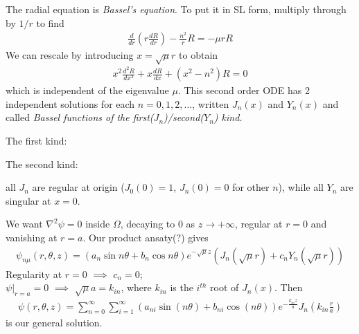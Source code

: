 \documentclass[a4paper]{article}
\begin{document}
The radial equation is \emph{Bassel's equation}. To put it in SL form, multiply through by $1/r$ to find
\begin{equation*}
\begin{aligned}
\frac{d}{dr} \left(r\frac{dR}{dr}\right) - \frac{n^2}{r} R = -\mu r R
\end{aligned}
\end{equation*}
We can rescale by introducing $x = \sqrt{\mu} r$ to obtain
\begin{equation*}
\begin{aligned}
x^2 \frac{d^2R}{dx^2} + x\frac{dR}{dx} + \left(x^2 - n^2\right) R = 0
\end{aligned}
\end{equation*}
which is independent of the eigenvalue $\mu$. This second order ODE has 2 independent solutions for each $n=0,1,2,...$, written $J_n\left(x\right)$ and $Y_n\left(x\right)$ and called \emph{Bassel functions of the first($J_n$)/second($Y_n$) kind.}

The first kind:


The second kind:


all $J_n$ are regular at origin ($J_0\left(0\right) = 1$, $J_n\left(0\right) = 0$ for other $n$), while all $Y_n$ are singular at $x=0$.

We want $\nabla^2 \psi = 0$ inside $\Omega$, decaying to $0$ as $z \to +\infty$, regular at $r=0$ and vanishing at $r=a$. Our product ansaty(?) gives
\begin{equation*}
\begin{aligned}
\psi_{n\mu}\left(r,\theta,z\right) = \left(a_n\sin n\theta+b_n \cos n\theta\right) e^{-\sqrt{\mu}z} \left(J_n\left(\sqrt{\mu}r\right) + c_n Y_n \left(\sqrt{\mu}r\right)\right)
\end{aligned}
\end{equation*}
Regularity at $r=0$ $\implies$ $c_n=0$;\\
$\psi|_{r=a}=0$ $\implies$ $\sqrt{\mu} a = k_{in}$, where $k_{in}$ is the $i^{th}$ root of $J_n\left(x\right)$. Then
\begin{equation*}
\begin{aligned}
\psi\left(r,\theta,z\right) = \sum_{n=0}^\infty \sum_{i=1}^\infty \left(a_{ni}\sin\left(n\theta\right) + b_{ni}\cos\left(n\theta\right)\right) e^{-\frac{k_{in}z}{a}} J_n\left(k_{in}\frac{r}{a}\right)
\end{aligned}
\end{equation*}
is our general solution.
\end{document}
